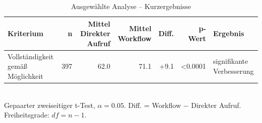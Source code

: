 \begin{table}[htbp]
\centering
\caption{Ausgewählte Analyse -- Kurzergebnisse}
\begin{tabular}{lrrrrrl}
\toprule
Kriterium & n & Mittel Direkter Aufruf & Mittel Workflow & Diff. & p-Wert & Ergebnis \\
\midrule
Vollständigkeit gemäß Möglichkeit & 397 & 62.0 & 71.1 & +9.1 & <0.0001 & signifikante Verbesserung \\
\bottomrule
\end{tabular}
\\[2mm]
\footnotesize Gepaarter zweiseitiger t-Test, $\alpha=0.05$. Diff. = Workflow $-$ Direkter Aufruf. Freiheitsgrade: $df=n-1$.
\end{table}
